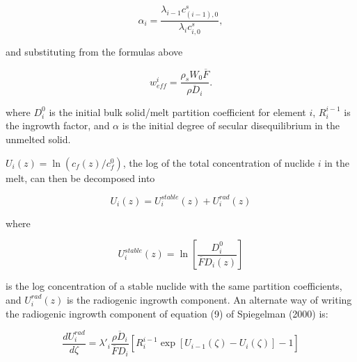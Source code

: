 \documentclass[draft]{agujournal2019}
\begin{document}
\begin{linenomath*}
\begin{equation}
    \alpha_i = \frac{\lambda_{i-1} c_{(i-1),0}^s}{\lambda_i c_{i,0}^s} ,\label{eq:13}
\end{equation}
\end{linenomath*}

and substituting from the formulas above

\begin{linenomath*}
\begin{equation}
    w_{eff}^i = \frac{\rho_s W_0 \overline{F}}{\overline{\rho D_i}} .\label{eq:14}
\end{equation}
\end{linenomath*}

where $D_i^0$ is the initial bulk solid/melt partition coefficient for element $i$, $R_i^{i-1}$ is the ingrowth factor, and $\alpha$ is the initial degree of secular disequilibrium in the unmelted solid.

$U_i(z) = \ln(c_f(z)/c_f^0)$, the log of the total concentration of nuclide $i$ in the melt, can then be decomposed into

\begin{linenomath*}
\begin{equation}
  U_i(z) = U^{stable}_i(z) + U^{rad}_i(z)\label{eq:15}
\end{equation}
\end{linenomath*}

where

\begin{linenomath*}
\begin{equation}
    U^{stable}_i(z) = \ln\left[ \frac{D_i^0}{\overline{F}D_i(z)}\right]\label{eq:16}
\end{equation}
\end{linenomath*}

is the log concentration of a stable nuclide with the same partition coefficients, and $U^{rad}_i(z)$ is the radiogenic ingrowth component. An alternate way of writing the radiogenic ingrowth component of equation (9) of Spiegelman (2000) is:

\begin{linenomath*}
\begin{equation}
    \frac{dU_i^{rad}}{d\zeta} = \lambda'_i\frac{\overline{\rho D_{i}}}{\overline{F} D_{i}}\left[R_i^{i-1}\exp[U_{i-1}(\zeta)-U_i(\zeta)] - 1\right]\label{eq:17}
\end{equation}
\end{linenomath*}
\end{document}
